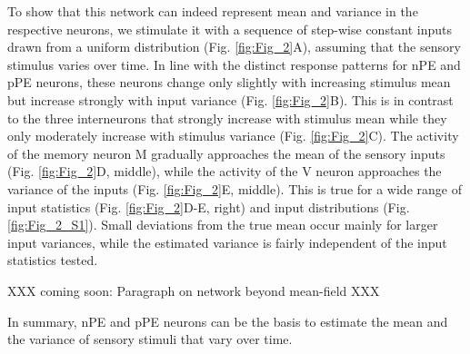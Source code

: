 \documentclass[10pt,a4paper]{article}
\begin{document}
To show that this network can indeed represent mean and variance in the respective neurons, we stimulate it with a sequence of step-wise constant inputs drawn from a uniform distribution (Fig. \ref{fig:Fig_2}A), assuming that the sensory stimulus varies over time. In line with the distinct response patterns for nPE and pPE neurons, these neurons change only slightly with increasing stimulus mean but increase strongly with input variance (Fig. \ref{fig:Fig_2}B). This is in contrast to the three interneurons that strongly increase with stimulus mean while they only moderately increase with stimulus variance (Fig. \ref{fig:Fig_2}C). The activity of the memory neuron M gradually approaches the mean of the sensory inputs (Fig. \ref{fig:Fig_2}D, middle), while the activity of the V neuron approaches the variance of the inputs (Fig. \ref{fig:Fig_2}E, middle). This is true for a wide range of input statistics (Fig. \ref{fig:Fig_2}D-E, right) and input distributions (Fig. \ref{fig:Fig_2_S1}). Small deviations from the true mean occur mainly for larger input variances, while the estimated variance is fairly independent of the input statistics tested. 

XXX coming soon: Paragraph on network beyond mean-field XXX

In summary, nPE and pPE neurons can be the basis to estimate the mean and the variance of sensory stimuli that vary over time.
\end{document}
